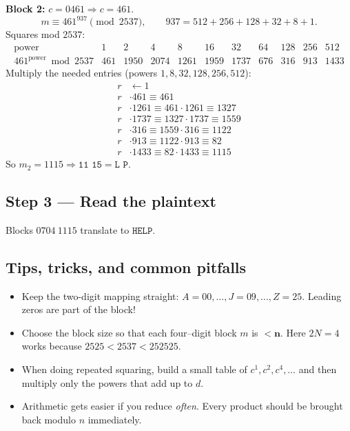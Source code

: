 \documentclass[12pt]{article}
\begin{document}
\medskip
\textbf{Block 2:} \(c=0461\Rightarrow c=461\).
\[
m \equiv 461^{937}\pmod{2537},\qquad 937=512+256+128+32+8+1.
\]
Squares mod \(2537\):
\[
\begin{array}{r|rrrrrrrrr}
\text{power} & 1 & 2 & 4 & 8 & 16 & 32 & 64 & 128 & 256 & 512\\\hline
461^{\text{power}} \bmod 2537 & 
461 & 1950 & 2074 & 1261 & 1959 & 1737 & 676 & 316 & 913 & 1433
\end{array}
\]
Multiply the needed entries (powers \(1,8,32,128,256,512\)):
\[
\begin{aligned}
r&\leftarrow 1\\
r&\cdot 461 \equiv 461\\
r&\cdot 1261 \equiv  461\cdot1261 \equiv  1327\\
r&\cdot 1737 \equiv  1327\cdot1737 \equiv  1559\\
r&\cdot 316 \equiv  1559\cdot316 \equiv  1122\\
r&\cdot 913 \equiv  1122\cdot913 \equiv  82\\
r&\cdot 1433 \equiv  82\cdot1433 \equiv \boxed{1115}
\end{aligned}
\]
So \(m_2=1115\Rightarrow \texttt{11 15}=\texttt{L P}\).

\subsection*{Step 3 — Read the plaintext}
Blocks \(0704\ 1115\) translate to \(\boxed{\texttt{HELP}}\).

\subsection*{Tips, tricks, and common pitfalls}
\begin{itemize}[leftmargin=1.2em]
\item Keep the two-digit mapping straight: \(A=00,\ldots,J=09,\ldots,Z=25\). Leading zeros are part of the block!
\item Choose the block size so that each four–digit block \(m\) is \(\boldsymbol{< n}\). Here \(2N=4\) works because \(2525 < 2537 < 252525\).
\item When doing repeated squaring, build a small table of \(c^{1}, c^{2}, c^{4}, \dots\) and then multiply only the powers that add up to \(d\).
\item Arithmetic gets easier if you reduce \emph{often}. Every product should be brought back modulo \(n\) immediately.
\end{itemize}
\end{document}
